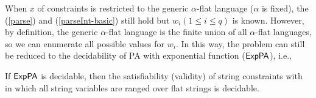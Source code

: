 {When $x$ of {\parseInt} constraints is restricted to the
generic $\alpha$-flat language ($\alpha$ is fixed),
the (\ref{parse}) and (\ref{parseInt-basic}) still hold 
but $w_i(1\le i\le q)$ is known.
However,
by definition,
the generic $\alpha$-flat language is the finite union of all $\alpha$-flat languages,
so we can enumerate all possible values for $w_i$.
In this way,
the problem can still be reduced to the decidability of PA with exponential function (${\sf ExpPA}$), i.e.,
\begin{theorem} \label{thm:string-parInt}
If {${\sf ExpPA}$} is decidable, then the satisfiability (validity) of string constraints with {\parseInt} in which all string variables 
are ranged over flat strings is decidable. 
\end{theorem}
}

